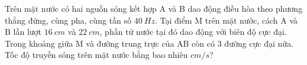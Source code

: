 \begin{ex}
	Trên mặt nước có hai nguồn sóng kết hợp A và B dao động điều hòa theo phương thẳng đứng, cùng pha, cùng tần số $40 \ Hz$. Tại điểm M trên mặt nước, cách A và B lần lượt $16 \ cm$ và $22 \ cm$, phần tử nước tại đó dao động với biên độ cực đại. Trong khoảng giữa M và đường trung trực của AB còn có $3$ đường cực đại nữa. Tốc độ truyền sóng trên mặt nước bằng bao nhiêu $cm/s$?
\end{ex}